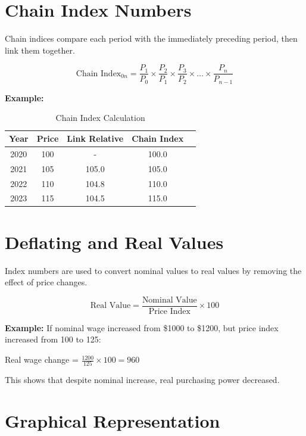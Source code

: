 \documentclass[twoside]{book}
\begin{document}
\section{Chain Index Numbers}

Chain indices compare each period with the immediately preceding period, then link them together.

\begin{equation}
    \text{Chain Index}_{0n} = \frac{P_1}{P_0} \times \frac{P_2}{P_1} \times \frac{P_3}{P_2} \times \ldots \times \frac{P_n}{P_{n-1}}
\end{equation}

\textbf{Example:}

\begin{table}[h]
\centering
\caption{Chain Index Calculation}
\begin{tabular}{ccccc}
\toprule
\textbf{Year} & \textbf{Price} & \textbf{Link Relative} & \textbf{Chain Index} \\
\midrule
2020 & 100 & - & 100.0 \\
2021 & 105 & 105.0 & 105.0 \\
2022 & 110 & 104.8 & 110.0 \\
2023 & 115 & 104.5 & 115.0 \\
\bottomrule
\end{tabular}
\end{table}

\section{Deflating and Real Values}

Index numbers are used to convert nominal values to real values by removing the effect of price changes.

\begin{equation}
    \text{Real Value} = \frac{\text{Nominal Value}}{\text{Price Index}} \times 100
\end{equation}

\textbf{Example:} If nominal wage increased from \$1000 to \$1200, but price index increased from 100 to 125:

Real wage change = $\frac{1200}{125} \times 100 = 960$

This shows that despite nominal increase, real purchasing power decreased.

\section{Graphical Representation}
\end{document}
